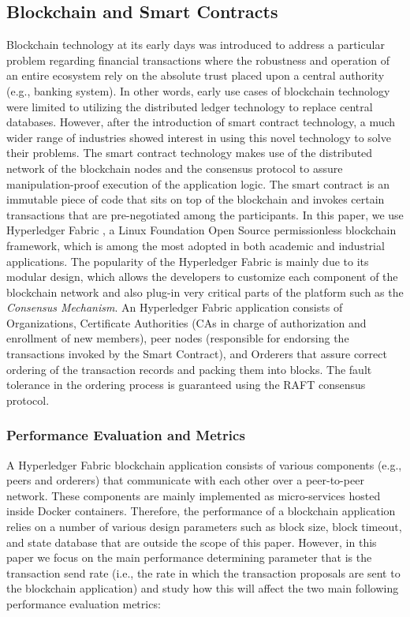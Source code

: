 \subsection{Blockchain and Smart Contracts}
Blockchain technology at its early days was introduced to address a particular problem regarding financial transactions where the robustness and operation of an entire ecosystem rely on the absolute trust placed upon a central authority (e.g., banking system). In other words, early use cases of blockchain technology were limited to utilizing the distributed ledger technology to replace central databases. However, after the introduction of smart contract technology, a much wider range of industries showed interest in using this novel technology to solve their problems. The smart contract technology makes use of the distributed network of the blockchain nodes and the consensus protocol to assure manipulation-proof execution of the application logic. The smart contract is an immutable piece of code that sits on top of the blockchain and invokes certain transactions that are pre-negotiated among the participants. In this paper, we use Hyperledger Fabric \cite{fabric}, a Linux Foundation Open Source permissionless blockchain framework, which is among the most adopted in both academic and industrial applications. 
The popularity of the Hyperledger Fabric is mainly due to its modular design, which allows the developers to customize each component of the blockchain network and also plug-in very critical parts of the platform such as the \textit{Consensus Mechanism}. 
An Hyperledger Fabric application consists of Organizations, Certificate Authorities  (CAs in charge of authorization and enrollment of new members), peer nodes (responsible for endorsing the transactions invoked by the Smart Contract), and Orderers that assure correct ordering of the transaction records and packing them into blocks. The fault tolerance in the ordering process is guaranteed using the RAFT \cite{Ongaro:raft} consensus protocol. 
\subsubsection{Performance Evaluation and Metrics}
A Hyperledger Fabric blockchain application consists of various components (e.g., peers and orderers) that communicate with each other over a peer-to-peer network. These components are mainly implemented as micro-services hosted inside Docker containers. Therefore, the performance of a blockchain application relies on a number of various design parameters such as block size, block timeout, and state database \cite{8526892} that are outside the scope of this paper. However, in this paper we focus on the main performance determining parameter that is the transaction send rate (i.e., the rate in which the transaction proposals are sent to the blockchain application) and study how this will affect the two main following performance evaluation metrics:

